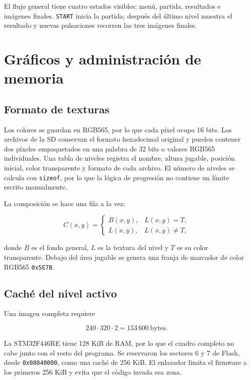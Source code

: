 \documentclass[11pt,letterpaper]{article}
\begin{document}
El flujo general tiene cuatro estados visibles: menú, partida, resultados e imágenes
finales. \texttt{START} inicia la partida; después del último nivel muestra el
resultado y nuevas pulsaciones recorren las tres imágenes finales.

\section{Gráficos y administración de memoria}

\subsection{Formato de texturas}

Los colores se guardan en RGB565, por lo que cada píxel ocupa 16 bits. Los archivos
de la SD conservan el formato hexadecimal original y pueden contener dos píxeles
empaquetados en una palabra de 32 bits o valores RGB565 individuales. Una tabla de
niveles registra el nombre, altura jugable, posición inicial, color transparente y
formato de cada archivo. El número de niveles se calcula con \texttt{sizeof}, por lo
que la lógica de progresión no contiene un límite escrito manualmente.

La composición se hace una fila a la vez:

\begin{equation}
C(x,y)=
\begin{cases}
B(x,y), & L(x,y)=T,\\
L(x,y), & L(x,y)\neq T,
\end{cases}
\end{equation}

donde $B$ es el fondo general, $L$ es la textura del nivel y $T$ es su color
transparente. Debajo del área jugable se genera una franja de marcador de color
RGB565 \texttt{0x5E7B}.

\subsection{Caché del nivel activo}

Una imagen completa requiere

\begin{equation}
240\cdot320\cdot2=153\,600\ \text{bytes}.
\end{equation}

La STM32F446RE tiene 128 KiB de RAM, por lo que el cuadro completo no cabe junto con
el resto del programa. Se reservaron los sectores 6 y 7 de Flash, desde
\texttt{0x08040000}, como una caché de 256 KiB. El enlazador limita el firmware a los
primeros 256 KiB y evita que el código invada esa zona.
\end{document}
